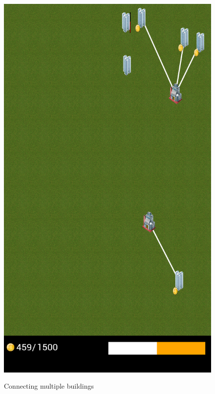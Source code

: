 \begin{figure}[H]
{		\includegraphics[scale=0.17]{pictures/sprint2-screen/sprint2-9}
	}
	\caption{Connecting multiple buildings}
	\end{figure}

